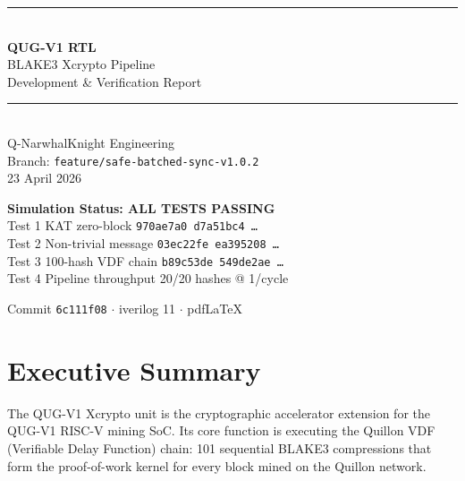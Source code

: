 \documentclass[11pt,a4paper]{article}
\begin{document}
\begin{titlepage}
  \centering
  \vspace*{2cm}
  {\color{quillonblue}\rule{\linewidth}{2pt}}\\[0.4cm]
  {\Huge\bfseries\color{quillonblue} QUG-V1 RTL}\\[0.3cm]
  {\Large\color{quillonorange} BLAKE3 Xcrypto Pipeline}\\[0.2cm]
  {\Large Development \& Verification Report}\\[0.2cm]
  {\color{quillonblue}\rule{\linewidth}{2pt}}\\[1.5cm]
  {\large Q-NarwhalKnight Engineering}\\[0.3cm]
  {\large Branch: \texttt{feature/safe-batched-sync-v1.0.2}}\\[0.3cm]
  {\large 23 April 2026}\\[2cm]

  \begin{tcolorbox}[
    enhanced, colback=quillongreen!10, colframe=quillongreen!80,
    width=0.8\linewidth, boxrule=1pt, left=12pt, right=12pt,
    top=8pt, bottom=8pt
  ]
  \centering
  {\large\bfseries\color{quillongreen} Simulation Status: ALL TESTS PASSING}\\[4pt]
  {\normalsize Test 1 KAT zero-block \hfill \texttt{970ae7a0 d7a51bc4 \ldots} \checkmark}\\
  {\normalsize Test 2 Non-trivial message \hfill \texttt{03ec22fe ea395208 \ldots} \checkmark}\\
  {\normalsize Test 3 100-hash VDF chain \hfill \texttt{b89c53de 549de2ae \ldots} \checkmark}\\
  {\normalsize Test 4 Pipeline throughput \hfill 20/20 hashes @ 1/cycle \checkmark}
  \end{tcolorbox}

  \vfill
  {\small Commit \texttt{6c111f08} $\cdot$ iverilog 11 $\cdot$ pdfLaTeX}
\end{titlepage}

\tableofcontents
\newpage

\section{Executive Summary}

The QUG-V1 Xcrypto unit is the cryptographic accelerator extension for the
QUG-V1 RISC-V mining SoC. Its core function is executing the Quillon VDF
(Verifiable Delay Function) chain: 101 sequential BLAKE3 compressions that
form the proof-of-work kernel for every block mined on the Quillon network.
\end{document}

